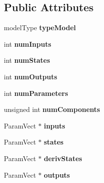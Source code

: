 \subsection*{Public Attributes}
\begin{DoxyCompactItemize}
\item 
model\+Type {\bfseries type\+Model}\hypertarget{classModel_a523ada7c8d36d9184048aa35b8fb3cc5}{}\label{classModel_a523ada7c8d36d9184048aa35b8fb3cc5}

\item 
int {\bfseries num\+Inputs}\hypertarget{classModel_a573bf3d8be623e43026465129d8fd994}{}\label{classModel_a573bf3d8be623e43026465129d8fd994}

\item 
int {\bfseries num\+States}\hypertarget{classModel_aa8e6e9a57dad78c50f7faad02c36cd51}{}\label{classModel_aa8e6e9a57dad78c50f7faad02c36cd51}

\item 
int {\bfseries num\+Outputs}\hypertarget{classModel_a3e77ba898f866a2700b7ca0287290976}{}\label{classModel_a3e77ba898f866a2700b7ca0287290976}

\item 
int {\bfseries num\+Parameters}\hypertarget{classModel_a32df6ccb5ac3452654824b870ca6d7bd}{}\label{classModel_a32df6ccb5ac3452654824b870ca6d7bd}

\item 
unsigned int {\bfseries num\+Components}\hypertarget{classModel_a4efbf9261f2d061ea38f22e654f0cd04}{}\label{classModel_a4efbf9261f2d061ea38f22e654f0cd04}

\item 
Param\+Vect $\ast$ {\bfseries inputs}\hypertarget{classModel_ae37148eddc1f582b21862c65825e4883}{}\label{classModel_ae37148eddc1f582b21862c65825e4883}

\item 
Param\+Vect $\ast$ {\bfseries states}\hypertarget{classModel_a95d938ddd2e21e3d515c73405439e3a4}{}\label{classModel_a95d938ddd2e21e3d515c73405439e3a4}

\item 
Param\+Vect $\ast$ {\bfseries deriv\+States}\hypertarget{classModel_a629a0640083ee168e9ce9f56b157a118}{}\label{classModel_a629a0640083ee168e9ce9f56b157a118}

\item 
Param\+Vect $\ast$ {\bfseries outputs}\hypertarget{classModel_a9bb34805b741e2487485fcf952d58113}{}\label{classModel_a9bb34805b741e2487485fcf952d58113}


\end{DoxyCompactItemize}
